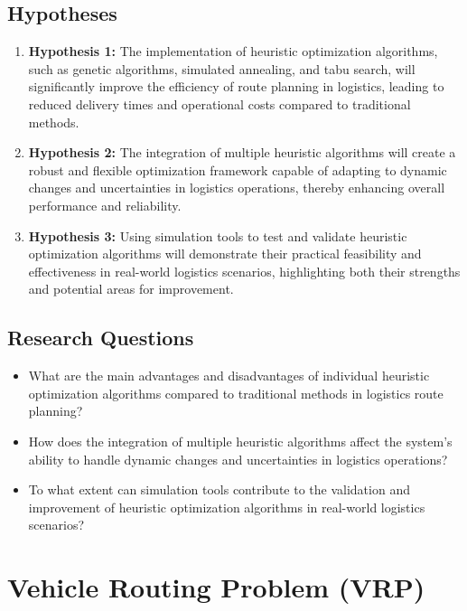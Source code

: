 \documentclass{article}
\begin{document}
    \subsection{Hypotheses}\label{subsec:hypotheses}
    \begin{enumerate}
        \item \textbf{Hypothesis 1:} The implementation of heuristic optimization algorithms, such as genetic algorithms, simulated annealing, and tabu search, will significantly improve the efficiency of route planning in logistics, leading to reduced delivery times and operational costs compared to traditional methods.
        \item \textbf{Hypothesis 2:} The integration of multiple heuristic algorithms will create a robust and flexible optimization framework capable of adapting to dynamic changes and uncertainties in logistics operations, thereby enhancing overall performance and reliability.
        \item \textbf{Hypothesis 3:} Using simulation tools to test and validate heuristic optimization algorithms will demonstrate their practical feasibility and effectiveness in real-world logistics scenarios, highlighting both their strengths and potential areas for improvement.
    \end{enumerate}

    \subsection{Research Questions}\label{subsec:research_questions}
    \begin{itemize}
        \item What are the main advantages and disadvantages of individual heuristic optimization algorithms compared to traditional methods in logistics route planning?
        \item How does the integration of multiple heuristic algorithms affect the system's ability to handle dynamic changes and uncertainties in logistics operations?
        \item To what extent can simulation tools contribute to the validation and improvement of heuristic optimization algorithms in real-world logistics scenarios?
    \end{itemize}


    \newpage


    \section{Vehicle Routing Problem (VRP)}\label{vehicle-routing-problem}
\end{document}
